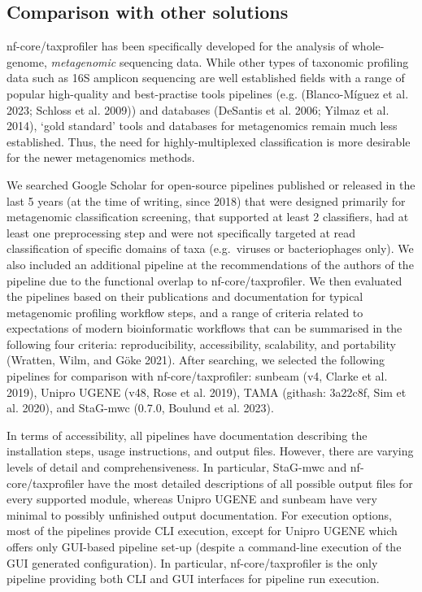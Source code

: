 \documentclass[
]{article}
\begin{document}
\hypertarget{comparison-with-other-solutions}{%
\subsection{Comparison with other
solutions}\label{comparison-with-other-solutions}}

nf-core/taxprofiler has been specifically developed for the analysis of
whole-genome, \emph{metagenomic} sequencing data. While other types of
taxonomic profiling data such as 16S amplicon sequencing are well
established fields with a range of popular high-quality and
best-practise tools pipelines (e.g. (Blanco-Míguez et al. 2023; Schloss
et al. 2009)) and databases (DeSantis et al. 2006; Yilmaz et al. 2014),
`gold standard' tools and databases for metagenomics remain much less
established. Thus, the need for highly-multiplexed classification is
more desirable for the newer metagenomics methods.

We searched Google Scholar for open-source pipelines published or
released in the last 5 years (at the time of writing, since 2018) that
were designed primarily for metagenomic classification screening, that
supported at least 2 classifiers, had at least one preprocessing step
and were not specifically targeted at read classification of specific
domains of taxa (e.g.~viruses or bacteriophages only). We also included
an additional pipeline at the recommendations of the authors of the
pipeline due to the functional overlap to nf-core/taxprofiler. We then
evaluated the pipelines based on their publications and documentation
for typical metagenomic profiling workflow steps, and a range of
criteria related to expectations of modern bioinformatic workflows that
can be summarised in the following four criteria: reproducibility,
accessibility, scalability, and portability (Wratten, Wilm, and Göke
2021). After searching, we selected the following pipelines for
comparison with nf-core/taxprofiler: sunbeam (v4, Clarke et al. 2019),
Unipro UGENE (v48, Rose et al. 2019), TAMA (githash: 3a22c8f, Sim et al.
2020), and StaG-mwc (0.7.0, Boulund et al. 2023).

In terms of accessibility, all pipelines have documentation describing
the installation steps, usage instructions, and output files. However,
there are varying levels of detail and comprehensiveness. In particular,
StaG-mwc and nf-core/taxprofiler have the most detailed descriptions of
all possible output files for every supported module, whereas Unipro
UGENE and sunbeam have very minimal to possibly unfinished output
documentation. For execution options, most of the pipelines provide CLI
execution, except for Unipro UGENE which offers only GUI-based pipeline
set-up (despite a command-line execution of the GUI generated
configuration). In particular, nf-core/taxprofiler is the only pipeline
providing both CLI and GUI interfaces for pipeline run execution.
\end{document}

